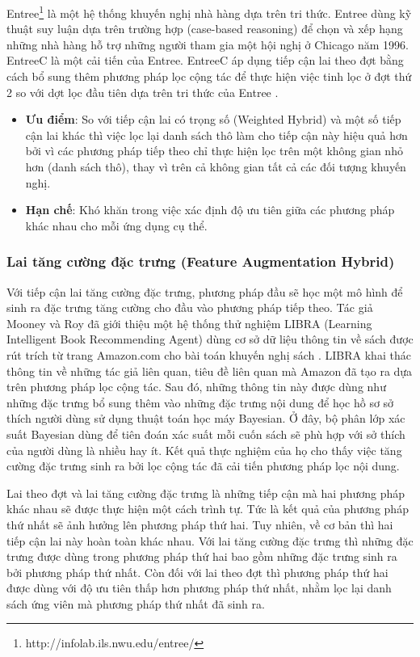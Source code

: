 Entree\footnote{http://infolab.ils.nwu.edu/entree/} là một hệ thống khuyến nghị nhà hàng dựa trên tri thức. Entree dùng kỹ thuật suy luận dựa trên trường hợp (case-based reasoning) để chọn và xếp hạng những nhà hàng hỗ trợ những người tham gia một hội nghị ở Chicago năm 1996. EntreeC là một cải tiến của Entree. EntreeC áp dụng tiếp cận lai theo đợt bằng cách bổ sung thêm phương pháp lọc cộng tác để thực hiện việc tinh lọc ở đợt thứ 2 so với dợt lọc đầu tiên dựa trên tri thức của Entree \cite{Robin:2002:HybridRS_Survey}. 

\begin{itemize}
	\item \textbf{Ưu điểm}: So với tiếp cận lai có trọng số (Weighted Hybrid) và một số tiếp cận lai khác thì việc lọc lại danh sách thô làm cho tiếp cận này hiệu quả hơn bởi vì các phương pháp tiếp theo chỉ thực hiện lọc trên một không gian nhỏ hơn (danh sách thô), thay vì trên cả không gian tất cả các đối tượng khuyến nghị.
\end{itemize}
\begin{itemize}
	\item \textbf{Hạn chế}: Khó khăn trong việc xác định độ ưu tiên giữa các phương pháp khác nhau cho mỗi ứng dụng cụ thể.
\end{itemize}

\subsubsection{Lai tăng cường đặc trưng (Feature Augmentation Hybrid)}
Với tiếp cận lai tăng cường đặc trưng, phương pháp đầu sẽ học một mô hình để sinh ra đặc trưng tăng cường cho đầu vào phương pháp tiếp theo. Tác giả Mooney và Roy đã giới thiệu một hệ thống thử nghiệm LIBRA (Learning Intelligent Book Recommending Agent) dùng cơ sở dữ liệu thông tin về sách được rút trích từ trang Amazon.com cho bài toán khuyến nghị sách \cite{Mooney:2000:CBR}. LIBRA khai thác thông tin về những tác giả liên quan, tiêu đề liên quan mà Amazon đã tạo ra dựa trên phương pháp lọc cộng tác. Sau đó, những thông tin này được dùng như những đặc trưng bổ sung thêm vào những đặc trưng nội dung để học hồ sơ sở thích người dùng sử dụng thuật toán học máy Bayesian. Ở đây, bộ phân lớp xác suất Bayesian dùng để tiên đoán xác suất mỗi cuốn sách sẽ phù hợp với sở thích của người dùng là nhiều hay ít. Kết quả thực nghiệm của họ cho thấy việc tăng cường đặc trưng sinh ra bởi lọc cộng tác đã cải tiến phương pháp lọc nội dung.

Lai theo đợt và lai tăng cường đặc trưng là những tiếp cận mà hai phương pháp khác nhau sẽ được thực hiện một cách trình tự. Tức là kết quả của phương pháp thứ nhất sẽ ảnh hưởng lên phương pháp thứ hai. Tuy nhiên, về cơ bản thì hai tiếp cận lai này hoàn toàn khác nhau. Với lai tăng cường đặc trưng thì những đặc trưng được dùng trong phương pháp thứ hai bao gồm những đặc trưng sinh ra bởi phương pháp thứ nhất. Còn đối với lai theo đợt thì phương pháp thứ hai được dùng với độ ưu tiên thấp hơn phương pháp thứ nhất, nhằm lọc lại danh sách ứng viên mà phương pháp thứ nhất đã sinh ra. 

